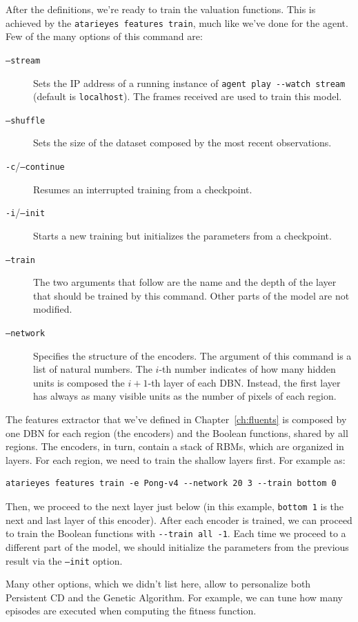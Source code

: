 After the definitions, we're ready to train the valuation functions.
This is achieved by the \verb|atarieyes features train|, much
like we've done for the agent. Few of the many options of this command are:
\begin{description}
	\item [\texttt{--stream}] Sets the IP address of a running instance of
		\verb|agent play --watch stream| (default is \texttt{localhost}). The
		frames received are used to train this model.
	\item [\texttt{--shuffle}] Sets the size of the dataset composed by the most
		recent observations.
	\item [\texttt{-c}/\texttt{--continue}] Resumes an interrupted training from 
		a checkpoint.
	\item [\texttt{-i}/\texttt{--init}] Starts a new training but initializes
		the parameters from a checkpoint.
	\item [\texttt{--train}] The two arguments that follow are the name and the
		depth of the layer that should be trained by this command. Other parts of
		the model are not modified.
	\item [\texttt{--network}] Specifies the structure of the encoders. The
		argument of this command is a list of natural numbers. The $i$-th number
		indicates of how many hidden units is composed the $i+1$-th layer of each
		DBN. Instead, the first layer has always as many visible units as the
		number of pixels of each region.
\end{description}
The features extractor that we've defined in Chapter~\ref{ch:fluents} is
composed by one DBN for each region (the encoders) and the Boolean functions,
shared by all regions. The encoders, in turn, contain a stack of RBMs, which
are organized in layers. For each region, we need to train the shallow layers
first. For example as:
\begin{verbatim}
atarieyes features train -e Pong-v4 --network 20 3 --train bottom 0
\end{verbatim}
Then, we proceed to the next layer just below (in this example,
\verb|bottom 1| is the next and last layer of this encoder). After each
encoder is trained, we can proceed to train the Boolean functions with
\verb|--train all -1|. Each time we proceed to a different part of the model,
we should initialize the parameters from the previous result via the
\texttt{--init} option.

Many other options, which we didn't list here, allow to personalize both
Persistent CD and the Genetic Algorithm. For example, we can tune how many
episodes are executed when computing the fitness function.

